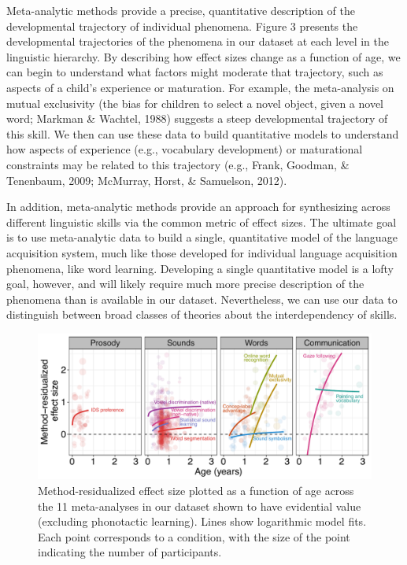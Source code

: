 \documentclass[english,floatsintext,man]{apa6}
\theoremstyle{definition}
\theoremstyle{definition}
\theoremstyle{remark}
\begin{document}
Meta-analytic methods provide a precise, quantitative description of the
developmental trajectory of individual phenomena. Figure 3 presents the
developmental trajectories of the phenomena in our dataset at each level
in the linguistic hierarchy. By describing how effect sizes change as a
function of age, we can begin to understand what factors might moderate
that trajectory, such as aspects of a child's experience or maturation.
For example, the meta-analysis on mutual exclusivity (the bias for
children to select a novel object, given a novel word; Markman \&
Wachtel, 1988) suggests a steep developmental trajectory of this skill.
We then can use these data to build quantitative models to understand
how aspects of experience (e.g., vocabulary development) or maturational
constraints may be related to this trajectory (e.g., Frank, Goodman, \&
Tenenbaum, 2009; McMurray, Horst, \& Samuelson, 2012).

In addition, meta-analytic methods provide an approach for synthesizing
across different linguistic skills via the common metric of effect
sizes. The ultimate goal is to use meta-analytic data to build a single,
quantitative model of the language acquisition system, much like those
developed for individual language acquisition phenomena, like word
learning. Developing a single quantitative model is a lofty goal,
however, and will likely require much more precise description of the
phenomena than is available in our dataset. Nevertheless, we can use our
data to distinguish between broad classes of theories about the
interdependency of skills.

\begin{figure}
\centering
\includegraphics{figs/fig3_lab.pdf}
\caption{\label{fig:unnamed-chunk-5}Method-residualized effect size plotted
as a function of age across the 11 meta-analyses in our dataset shown to
have evidential value (excluding phonotactic learning). Lines show
logarithmic model fits. Each point corresponds to a condition, with the
size of the point indicating the number of participants.}
\end{figure}
\end{document}
